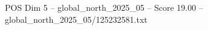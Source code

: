\begin{textsample}{POS Dim 5 – global\_north\_2025\_05 – Score 19.00 – global\_north\_2025\_05/125232581.txt}
\end{textsample}
